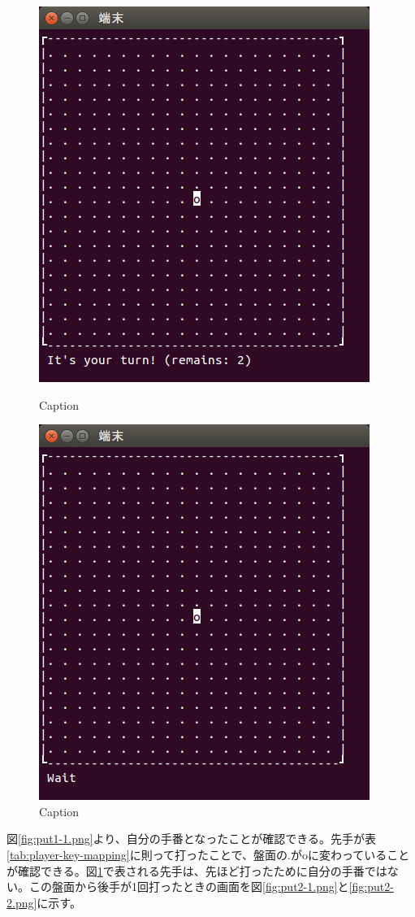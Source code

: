 \documentclass[a4j, titlepage, 10pt]{jsarticle}
\begin{document}
\begin{figure}[H]
  \begin{minipage}{0.5\hsize}
    \centering
    \includegraphics[scale=0.5]{img/put1-1.png}
    \caption{Caption}
    \label{fig:put1-1.png}
  \end{minipage}
  \begin{minipage}{0.5\hsize}
    \includegraphics[scale=0.5]{img/put1-2.png}
    \caption{Caption}
    \label{fig:put1-2.png}
  \end{minipage}
\end{figure}
図\ref{fig:put1-1.png}より、自分の手番となったことが確認できる。先手が表\ref{tab:player-key-mapping}に則って打ったことで、盤面の{\ttfamily .}が{\ttfamily o}に変わっていることが確認できる。図\ref{fig:put1-2.png}で表される先手は、先ほど打ったために自分の手番ではない。この盤面から後手が1回打ったときの画面を図\ref{fig:put2-1.png}と\ref{fig:put2-2.png}に示す。
\end{document}
